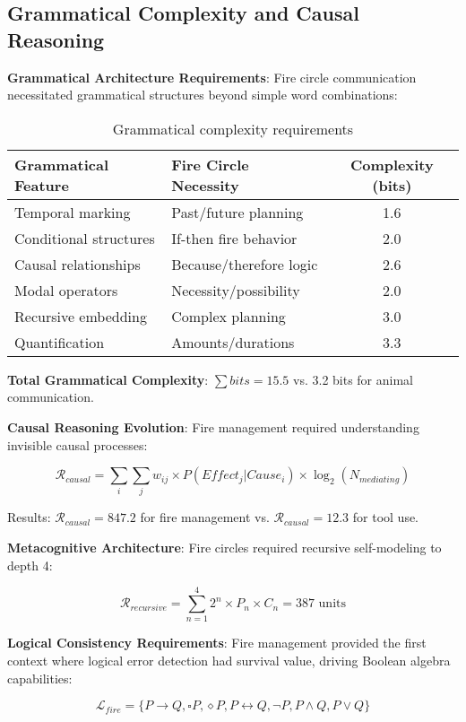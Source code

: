 \documentclass[11pt]{article}
\theoremstyle{remark}
\begin{document}
\subsection{Grammatical Complexity and Causal Reasoning}

\textbf{Grammatical Architecture Requirements}:
Fire circle communication necessitated grammatical structures beyond simple word combinations:

\begin{table}[h]
\centering
\begin{tabular}{|l|l|c|}
\hline
\textbf{Grammatical Feature} & \textbf{Fire Circle Necessity} & \textbf{Complexity (bits)} \\
\hline
Temporal marking & Past/future planning & 1.6 \\
Conditional structures & If-then fire behavior & 2.0 \\
Causal relationships & Because/therefore logic & 2.6 \\
Modal operators & Necessity/possibility & 2.0 \\
Recursive embedding & Complex planning & 3.0 \\
Quantification & Amounts/durations & 3.3 \\
\hline
\end{tabular}
\caption{Grammatical complexity requirements}
\end{table}

\textbf{Total Grammatical Complexity}: $\sum bits = 15.5$ vs. 3.2 bits for animal communication.

\textbf{Causal Reasoning Evolution}:
Fire management required understanding invisible causal processes:

$$\mathcal{R}_{causal} = \sum_{i} \sum_{j} w_{ij} \times P(Effect_j | Cause_i) \times \log_2(N_{mediating})$$

Results: $\mathcal{R}_{causal} = 847.2$ for fire management vs. $\mathcal{R}_{causal} = 12.3$ for tool use.

\textbf{Metacognitive Architecture}:
Fire circles required recursive self-modeling to depth 4:

$$\mathcal{R}_{recursive} = \sum_{n=1}^{4} 2^n \times P_n \times C_n = 387 \text{ units}$$

\textbf{Logical Consistency Requirements}:
Fire management provided the first context where logical error detection had survival value, driving Boolean algebra capabilities:

$$\mathcal{L}_{fire} = \{P \rightarrow Q, \square P, \diamond P, P \leftrightarrow Q, \neg P, P \land Q, P \lor Q\}$$
\end{document}
